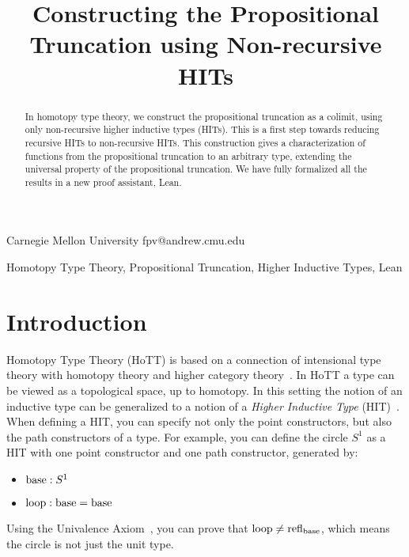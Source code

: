 \documentclass[square]{sigplanconf}
\newcommand{\refl}{\textnormal{refl}}
\newcommand{\base}{\textnormal{base}}
\newcommand{\lp}{\textnormal{loop}}
\theoremstyle{definition}
\theoremstyle{remark}
\begin{document}
 \setlength{\pdfpageheight}{\paperheight}
\setlength{\pdfpagewidth}{\paperwidth}

\toappear{}

\title{Constructing the Propositional Truncation using Non-recursive HITs}

           {Carnegie Mellon University}
           {fpv@andrew.cmu.edu}

\maketitle

\begin{abstract}
In homotopy type theory, we construct the propositional truncation as a colimit, using only
non-recursive higher inductive types (HITs). This is a first step towards reducing recursive HITs to
non-recursive HITs. This construction gives a characterization of functions from the propositional
truncation to an arbitrary type, extending the universal property of the propositional
truncation. We have fully formalized all the results in a new proof assistant, Lean.
\end{abstract}


\keywords Homotopy Type Theory, Propositional Truncation, Higher Inductive Types, Lean

\section{Introduction}

Homotopy Type Theory (HoTT) is based on a connection of intensional type theory with homotopy theory
and higher category theory~\cite{Awodey2009homotopy}. In HoTT a type can be viewed as a topological
space, up to homotopy. In this setting the notion of an inductive type can be generalized to a
notion of a \emph{Higher Inductive Type} (HIT)~\cite{HoTTbook}. When defining a HIT, you can specify
not only the point constructors, but also the path constructors of a type. For example, you can
define the circle $S^1$ as a HIT with one point constructor and one path constructor, generated by:
\begin{itemize}
  \item $\base : S^1$
  \item $\lp : \base = \base$
\end{itemize}
Using the Univalence Axiom~\cite{Voevodsky2014univalence}, you can prove that $\lp \neq
\refl_\base$, which means the circle is not just the unit type.
\end{document}
